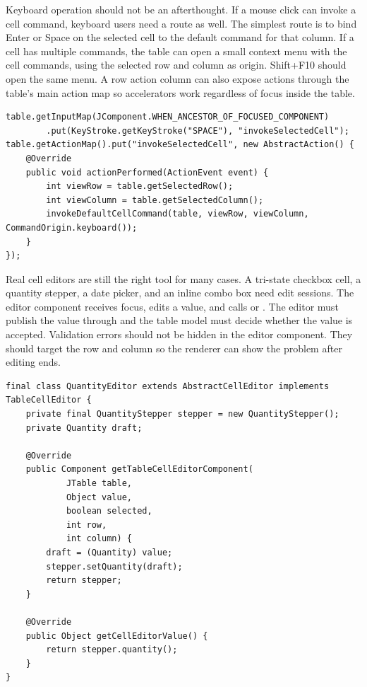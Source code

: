 Keyboard operation should not be an afterthought. If a mouse click can invoke a
cell command, keyboard users need a route as well. The simplest route is to bind
Enter or Space on the selected cell to the default command for that column. If a
cell has multiple commands, the table can open a small context menu with the
cell commands, using the selected row and column as origin. Shift+F10 should open
the same menu. A row action column can also expose actions through the table's
main action map so accelerators work regardless of focus inside the table.

\begin{lstlisting}[caption={The table action map invokes the selected cell command.}]
table.getInputMap(JComponent.WHEN_ANCESTOR_OF_FOCUSED_COMPONENT)
        .put(KeyStroke.getKeyStroke("SPACE"), "invokeSelectedCell");
table.getActionMap().put("invokeSelectedCell", new AbstractAction() {
    @Override
    public void actionPerformed(ActionEvent event) {
        int viewRow = table.getSelectedRow();
        int viewColumn = table.getSelectedColumn();
        invokeDefaultCellCommand(table, viewRow, viewColumn, CommandOrigin.keyboard());
    }
});
\end{lstlisting}

Real cell editors are still the right tool for many cases. A tri-state checkbox
cell, a quantity stepper, a date picker, and an inline combo box need edit
sessions. The editor component receives focus, edits a value, and calls
 or . The editor must publish
the value through  and the table model must decide
whether the value is accepted. Validation errors should not be hidden in the
editor component. They should target the row and column so the renderer can show
the problem after editing ends.

\begin{lstlisting}[caption={A cell editor commits through the table model, not directly into a row object.}]
final class QuantityEditor extends AbstractCellEditor implements TableCellEditor {
    private final QuantityStepper stepper = new QuantityStepper();
    private Quantity draft;

    @Override
    public Component getTableCellEditorComponent(
            JTable table,
            Object value,
            boolean selected,
            int row,
            int column) {
        draft = (Quantity) value;
        stepper.setQuantity(draft);
        return stepper;
    }

    @Override
    public Object getCellEditorValue() {
        return stepper.quantity();
    }
}
\end{lstlisting}

